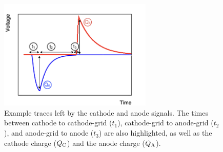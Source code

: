 \documentclass[a4paper,11pt]{article}
\begin{document}
\begin{figure}[tb]
	\begin{center}
	\includegraphics[width=0.65\textwidth]{figures/LifetimeMeasurementSchematics.png}
	\caption{Example traces left by the cathode and anode signals. 
	    The times between cathode to cathode-grid ($t_1$), cathode-grid to anode-grid ($t_2$), and anode-grid to anode ($t_3$) are also highlighted, as well as the cathode charge ($Q_{\rm C}$) and the anode charge ($Q_{\rm A}$).}
	\label{fig:sampleLifetimeFunctions}
	\end{center}
\end{figure}
\end{document}
